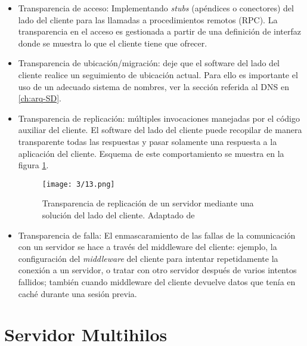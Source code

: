 	\begin{itemize} 
		
		\item Transparencia de acceso: Implementando \textit{stubs} (apéndices o conectores) del lado del cliente para las llamadas a procedimientos remotos (RPC). La transparencia en el  acceso es gestionada  a partir de una definición de interfaz donde se muestra lo que el cliente tiene que ofrecer. 		
				
		\item Transparencia de ubicación/migración: deje que el software del lado del cliente realice un seguimiento de ubicación actual. Para ello es importante el uso de un adecuado sistema de nombres, ver la sección referida al DNS en \ref{ch:arq-SD}. 
		
		\item Transparencia de replicación: múltiples invocaciones manejadas por el código auxiliar del cliente.  El software del lado del cliente puede recopilar de manera 	transparente todas las respuestas y pasar solamente una respuesta a la aplicación del cliente. Esquema  de este comportamiento se muestra en la  figura \ref{fig:Clientes-transp}.
		
		 \begin{figure} %
			\texttt{[image: 3/13.png]}
 			\caption{Transparencia de replicación de un servidor mediante una solución
 				del lado del cliente. Adaptado de \ST}
			\label{fig:Clientes-transp}
		\end{figure}
		 
		\item Transparencia de falla:  El enmascaramiento de las fallas de la comunicación con un servidor se hace a través del middleware del cliente:  ejemplo,   la 	configuración del \textit{middleware} del cliente para intentar repetidamente la conexión a un servidor, o  tratar con otro servidor después de varios intentos fallidos; también cuando middleware del cliente devuelve datos que tenía en caché durante una sesión previa. 
	\end{itemize}
	
	

\section{Servidor Multihilos}

